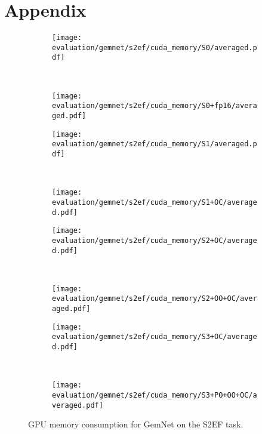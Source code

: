 \section*{Appendix}

\begin{figure}[H]

    \centering

    \begin{subfigure}[t]{0.49\textwidth}
        \centering
        \texttt{[image: evaluation/gemnet/s2ef/cuda\_memory/S0/averaged.pdf]}
    \end{subfigure}%
    ~
    \begin{subfigure}[t]{0.49\textwidth}
        \centering
        \texttt{[image: evaluation/gemnet/s2ef/cuda\_memory/S0+fp16/averaged.pdf]}
    \end{subfigure}

    \begin{subfigure}[t]{0.49\textwidth}
        \centering
        \texttt{[image: evaluation/gemnet/s2ef/cuda\_memory/S1/averaged.pdf]}
    \end{subfigure}%
    ~
    \begin{subfigure}[t]{0.49\textwidth}
        \centering
        \texttt{[image: evaluation/gemnet/s2ef/cuda\_memory/S1+OC/averaged.pdf]}
    \end{subfigure}

    \begin{subfigure}[t]{0.49\textwidth}
        \centering
        \texttt{[image: evaluation/gemnet/s2ef/cuda\_memory/S2+OC/averaged.pdf]}
    \end{subfigure}%
    ~
    \begin{subfigure}[t]{0.49\textwidth}
        \centering
        \texttt{[image: evaluation/gemnet/s2ef/cuda\_memory/S2+OO+OC/averaged.pdf]}
    \end{subfigure}

    \begin{subfigure}[t]{0.49\textwidth}
        \centering
        \texttt{[image: evaluation/gemnet/s2ef/cuda\_memory/S3+OC/averaged.pdf]}
    \end{subfigure}%
    ~
    \begin{subfigure}[t]{0.49\textwidth}
        \centering
        \texttt{[image: evaluation/gemnet/s2ef/cuda\_memory/S3+PO+OO+OC/averaged.pdf]}
    \end{subfigure}

    \caption{GPU memory consumption for GemNet on the S2EF task.}
    
\end{figure}

